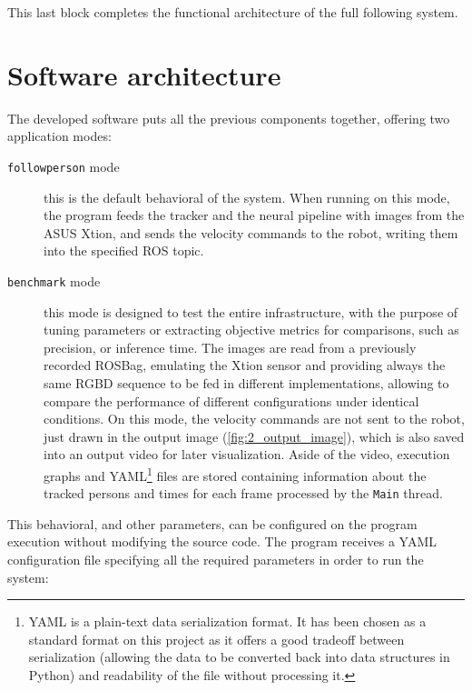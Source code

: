 This last block completes the functional architecture of the full following system.

\section{Software architecture}

The developed software puts all the previous components together, offering two application modes:
\begin{description}
	\item[\texttt{followperson} mode] this is the default behavioral of the system. When running on this mode, the program feeds the tracker and the neural pipeline with images from the ASUS Xtion, and sends the velocity commands to the robot, writing them into the specified ROS topic.
	
	\item[\texttt{benchmark} mode] this mode is designed to test the entire infrastructure, with the purpose of tuning parameters or extracting objective metrics for comparisons, such as precision, or inference time. The images are read from a previously recorded ROSBag, emulating the Xtion sensor and providing always the same RGBD sequence to be fed in different implementations, allowing to compare the performance of different configurations under identical conditions. On this mode, the velocity commands are not sent to the robot, just drawn in the output image (\autoref{fig:2_output_image}), which is also saved into an output video for later visualization. Aside of the video, execution graphs and YAML\footnote{YAML is a plain-text data serialization format. It has been chosen as a standard format on this project as it offers a good tradeoff between serialization (allowing the data to be converted back into data structures in Python) and  readability of the file without processing it.} files are stored containing information about the tracked persons and times for each frame processed by the \texttt{Main} thread.
\end{description}

This behavioral, and other parameters, can be configured on the program execution without modifying the source code. The program receives a YAML configuration file specifying all the required parameters in order to run the system:

